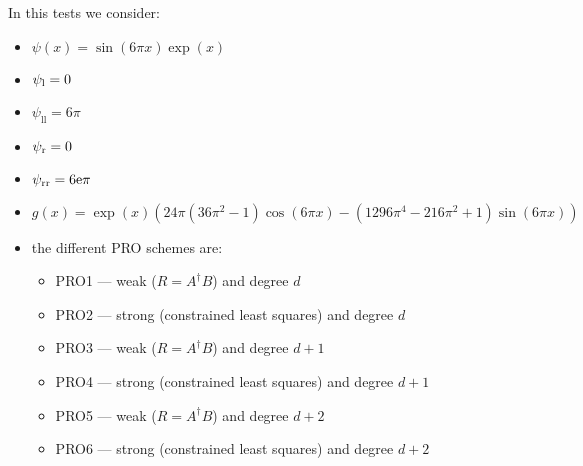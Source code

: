 \documentclass[11pt,a4paper]{article}
\author{}
\title{}
\theoremstyle{plain}
\theoremstyle{definition}
\begin{document}
In this tests we consider:
\begin{itemize}
\item $\psi(x)=\sin(6\pi x)\exp(x)$
\item $\psi_\text l=0$
\item $\psi_\text{ll}=6\pi$
\item $\psi_\text r=0$
\item $\psi_\text{rr}=6\text e\pi$
\item $g(x)=\exp(x)\left(24\pi(36\pi^2-1)\cos(6\pi x)-(1296\pi^4-216\pi^2+1)\sin(6\pi x)\right)$
\item the different PRO schemes are:
	\begin{itemize}
	\item PRO1 --- weak ($R=A^\dagger B$) and degree $d$
	\item PRO2 --- strong (constrained least squares) and degree $d$
	\item PRO3 --- weak ($R=A^\dagger B$) and degree $d+1$
	\item PRO4 --- strong (constrained least squares) and degree $d+1$
	\item PRO5 --- weak ($R=A^\dagger B$) and degree $d+2$
	\item PRO6 --- strong (constrained least squares) and degree $d+2$
	\end{itemize}
\end{itemize}




 
\end{document}
